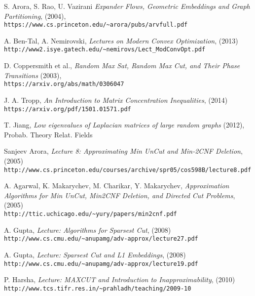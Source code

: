 \documentclass[12pt]{article}
\begin{document}
\renewcommand{\refname}{References}
\begin{thebibliography}{0}
	S. Arora, S. Rao, U. Vazirani {\it Expander Flows, Geometric Embeddings and Graph 
	Partitioning}, (2004), \\
	\verb'https://www.cs.princeton.edu/~arora/pubs/arvfull.pdf'
	
	A. Ben-Tal, A. Nemirovski, {\it Lectures on Modern Convex Optimization}, (2013)\\ 
	\verb'http://www2.isye.gatech.edu/~nemirovs/Lect_ModConvOpt.pdf'
	
	D. Coppersmith et al., {\it Random Max Sat, Random Max Cut, and Their Phase 
		Transitions} (2003),\\ 
	\verb'https://arxiv.org/abs/math/0306047'
	
	J. A. Tropp, {\it An Introduction to Matrix Concentration Inequalities}, (2014) \\
	\verb'https://arxiv.org/pdf/1501.01571.pdf'
	
	T. Jiang, {\it Low eigenvalues of Laplacian matrices of large random graphs} (2012), 
	Probab. Theory Relat. Fields
	
	Sanjeev Arora, {\it Lecture 8: Approximating Min UnCut and Min-2CNF Deletion}, 
	(2005) \\
	\verb'http://www.cs.princeton.edu/courses/archive/spr05/cos598B/lecture8.pdf'
	
	A. Agarwal, K. Makarychev, M. Charikar, Y. Makarychev, {\it Approximation 
	Algorithms for Min UnCut, Min2CNF Deletion, and Directed Cut Problems}, (2005) \\
	\verb'http://ttic.uchicago.edu/~yury/papers/min2cnf.pdf'
	
	A. Gupta, {\it Lecture: Algorithms for Sparsest Cut}, (2008) \\
	\verb'http://www.cs.cmu.edu/~anupamg/adv-approx/lecture27.pdf'
	
	A. Gupta, {\it Lecture: Sparsest Cut and L1 Embeddings}, (2008) \\
	\verb'http://www.cs.cmu.edu/~anupamg/adv-approx/lecture19.pdf'
	
	P. Harsha, {\it Lecture: MAXCUT and Introduction to Inapproximability}, (2010) \\
	\verb'http://www.tcs.tifr.res.in/~prahladh/teaching/2009-10'
	
	
	
\end{thebibliography}
\end{document}
